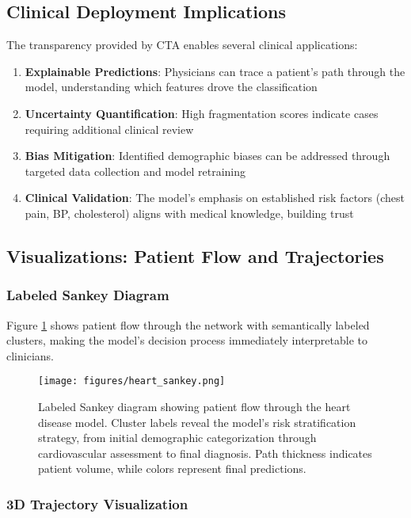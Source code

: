 \subsection{Clinical Deployment Implications}

The transparency provided by CTA enables several clinical applications:

\begin{enumerate}
    \item \textbf{Explainable Predictions}: Physicians can trace a patient's path through the model, understanding which features drove the classification
    \item \textbf{Uncertainty Quantification}: High fragmentation scores indicate cases requiring additional clinical review
    \item \textbf{Bias Mitigation}: Identified demographic biases can be addressed through targeted data collection and model retraining
    \item \textbf{Clinical Validation}: The model's emphasis on established risk factors (chest pain, BP, cholesterol) aligns with medical knowledge, building trust
\end{enumerate}

\subsection{Visualizations: Patient Flow and Trajectories}

\subsubsection{Labeled Sankey Diagram}

Figure \ref{fig:heart_sankey} shows patient flow through the network with semantically labeled clusters, making the model's decision process immediately interpretable to clinicians.

\begin{figure}[ht]
    \centering
    \texttt{[image: figures/heart\_sankey.png]}
    \caption{Labeled Sankey diagram showing patient flow through the heart disease model. Cluster labels reveal the model's risk stratification strategy, from initial demographic categorization through cardiovascular assessment to final diagnosis. Path thickness indicates patient volume, while colors represent final predictions.}
    \label{fig:heart_sankey}
\end{figure}

\subsubsection{3D Trajectory Visualization}

